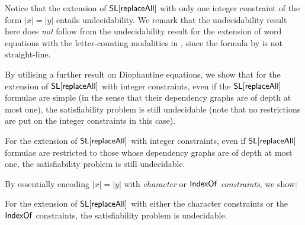 {%

Notice that the extension of $\mathsf{SL}[\mathsf{replaceAll}]$ with only one integer constraint of the form $|x| = |y|$ entails undecidability.  
We remark that the undecidability result here does \emph{not} follow from the undecidability result for the extension of word equations with the letter-counting modalities in \cite{buchi}, %
since the formula by \cite{buchi} is not straight-line. 

By utilising a further result on Diophantine equations, we show that for the extension of $\mathsf{SL}[\mathsf{replaceAll}]$ with integer constraints, even if the $\mathsf{SL}[\mathsf{replaceAll}]$ formulae are simple (in the sense that their dependency graphs are of depth at most one), the satisfiability problem is still undecidable (note that no restrictions are put on the integer constraints in this case).

%




\begin{theorem}\label{thm-ext-int-strong}
	For the extension of $\mathsf{SL}[\mathsf{replaceAll}]$ with integer constraints, even if $\mathsf{SL}[\mathsf{replaceAll}]$ formulae are restricted to those whose dependency graphs are of depth at most one, the satisfiability problem is still undecidable.
\end{theorem}

By essentially encoding $|x|=|y|$ with \emph{character} or \emph{$\mathsf{IndexOf}$ constraints}, we show:

\begin{proposition}\label{prop-ext-ch-index}
	For the extension of $\mathsf{SL}[\mathsf{replaceAll}]$ with either the character constraints or the $\mathsf{IndexOf}$ constraints, the satisfiability problem is undecidable. 
\end{proposition}


}

